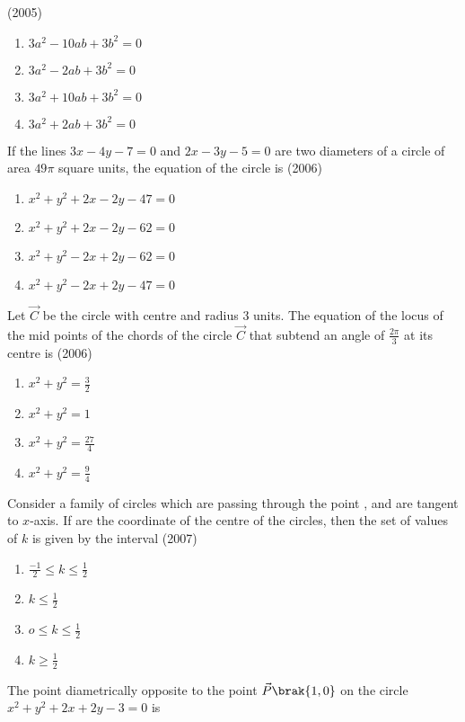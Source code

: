 \hfill{(2005)}
\begin{enumerate}
\item $3a^2-10ab+3b^2=0$
\item $3a^2-2ab+3b^2=0$
\item $3a^2+10ab+3b^2=0$
\item $3a^2+2ab+3b^2=0$
\end{enumerate}
\item If the lines $3x-4y-7=0$ and $2x-3y-5=0$ are two diameters of a circle of area $49\pi$ square units, the equation of the circle is 
\hfill{(2006)}
\begin{enumerate}
\item $x^2+y^2+2x-2y-47=0$
\item $x^2+y^2+2x-2y-62=0$
\item $x^2+y^2-2x+2y-62=0$
\item $x^2+y^2-2x+2y-47=0$
\end{enumerate}
\item Let $\vec{C}$ be the circle with centre  and radius 3 units. The equation of the locus of the mid points of the chords of the circle $\vec{C}$ that subtend an angle of $\frac{2\pi}{3}$ at its centre is
\hfill{(2006)}
\begin{multicols}{2}
\begin{enumerate}
\item $x^2+y^2=\frac{3}{2}$
\item $x^2+y^2=1$
\item $x^2+y^2=\frac{27}{4}$
\item $x^2+y^2=\frac{9}{4}$
\end{enumerate}
\end{multicols}
\item Consider a family of circles which are passing through the point , and are tangent to $x$-axis. If  are the coordinate of the centre of the circles, then the set of values of $k$ is given by the interval
\hfill{(2007)}
\begin{multicols}{2}
\begin{enumerate}
\item $\frac{-1}{2} \le k \le \frac{1}{2}$
\item $k \le \frac{1}{2}$
\item $o \le k \le \frac{1}{2}$
\item $k \ge \frac{1}{2}$
\end{enumerate}
\end{multicols}
\item The point diametrically opposite to the point $\vec{P}\brak{1,0}$ on the circle $x^2+y^2+2x+2y-3=0$ is 
